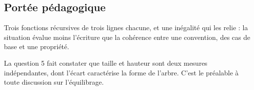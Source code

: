 \subsection*{Portée pédagogique}

Trois fonctions récursives de trois lignes chacune, et une inégalité qui les
relie : la situation évalue moins l'écriture que la cohérence entre une
convention, des cas de base et une propriété.

La question 5 fait constater que taille et hauteur sont deux mesures
indépendantes, dont l'écart caractérise la forme de l'arbre. C'est le
préalable à toute discussion sur l'équilibrage.
